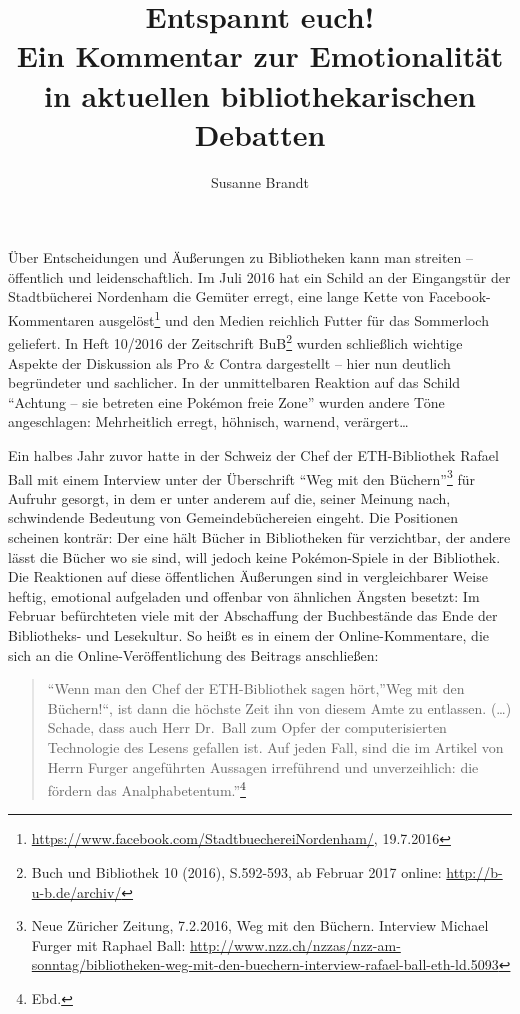 \documentclass[a4paper,
fontsize=11pt,
oneside,
numbers=noperiodatend,
parskip=half-,
bibliography=totoc,
final
]{scrartcl}
\title{\LARGE{Entspannt euch!\\Ein Kommentar zur Emotionalität in aktuellen bibliothekarischen Debatten}} %
\author{Susanne Brandt} %
\date{}
\begin{document}
\maketitle
\thispagestyle{fancyplain} 


Über Entscheidungen und Äußerungen zu Bibliotheken kann man streiten --
öffentlich und leidenschaftlich. Im Juli 2016 hat ein Schild an der
Eingangstür der Stadtbücherei Nordenham die Gemüter erregt, eine lange
Kette von Facebook-Kommentaren ausgelöst\footnote{\url{https://www.facebook.com/StadtbuechereiNordenham/},
  19.7.2016} und den Medien reichlich Futter für das Sommerloch
geliefert. In Heft 10/2016 der Zeitschrift BuB\footnote{Buch und
  Bibliothek 10 (2016), S.592-593, ab Februar 2017 online:
  \url{http://b-u-b.de/archiv/}} wurden schließlich wichtige Aspekte der
Diskussion als Pro \& Contra dargestellt -- hier nun deutlich
begründeter und sachlicher. In der unmittelbaren Reaktion auf das Schild
\enquote{Achtung -- sie betreten eine Pokémon freie Zone} wurden andere
Töne angeschlagen: Mehrheitlich erregt, höhnisch, warnend,
verärgert\ldots{}

Ein halbes Jahr zuvor hatte in der Schweiz der Chef der ETH-Bibliothek
Rafael Ball mit einem Interview unter der Überschrift \enquote{Weg mit
den Büchern}\footnote{Neue Züricher Zeitung, 7.2.2016, Weg mit den
  Büchern. Interview Michael Furger mit Raphael Ball:
  \url{http://www.nzz.ch/nzzas/nzz-am-sonntag/bibliotheken-weg-mit-den-buechern-interview-rafael-ball-eth-ld.5093}}
für Aufruhr gesorgt, in dem er unter anderem auf die, seiner Meinung
nach, schwindende Bedeutung von Gemeindebüchereien eingeht. Die
Positionen scheinen konträr: Der eine hält Bücher in Bibliotheken für
verzichtbar, der andere lässt die Bücher wo sie sind, will jedoch keine
Pokémon-Spiele in der Bibliothek. Die Reaktionen auf diese öffentlichen
Äußerungen sind in vergleichbarer Weise heftig, emotional aufgeladen und
offenbar von ähnlichen Ängsten besetzt: Im Februar befürchteten viele
mit der Abschaffung der Buchbestände das Ende der Bibliotheks- und
Lesekultur. So heißt es in einem der Online-Kommentare, die sich an die
Online-Veröffentlichung des Beitrags anschließen:

\begin{quote}
\enquote{Wenn man den Chef der ETH-Bibliothek sagen hört,}Weg mit den
Büchern!\enquote{, ist dann die höchste Zeit ihn von diesem Amte zu
entlassen. (\ldots{}) Schade, dass auch Herr Dr.~Ball zum Opfer der
computerisierten Technologie des Lesens gefallen ist. Auf jeden Fall,
sind die im Artikel von Herrn Furger angeführten Aussagen irreführend
und unverzeihlich: die fördern das Analphabetentum.}\footnote{Ebd.}
\end{quote}
\end{document}
